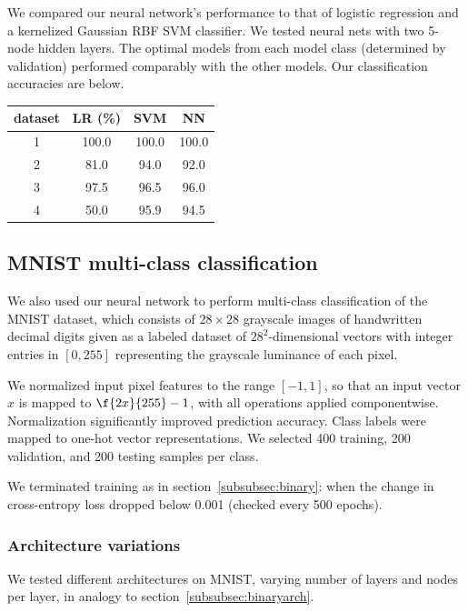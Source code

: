\documentclass{article}
\begin{document}
\begin{multicols}{2}
We compared our neural network's performance to that of 
logistic regression and a kernelized Gaussian RBF SVM classifier.
We tested neural nets with two 5-node hidden layers.
The optimal models from each model class (determined by validation)
performed comparably with the other models.
Our classification accuracies are below.

\begin{center}
    \begin{tabular}{c|c|c|c}
        dataset & LR (\%) & SVM & NN  \\\hline
        1	&100.0& 100.0 & 100.0\\
        2	&81.0 & 94.0 & 92.0 \\
        3	&97.5 & 96.5 & 96.0 \\
        4	&50.0 & 95.9 & 94.5
    \end{tabular}
\end{center}

\subsection{MNIST multi-class classification}

We also used our neural network
to perform multi-class classification of the MNIST dataset,
which consists of $28\times 28$ grayscale images of handwritten decimal digits
given as a labeled dataset of $28^2$-dimensional vectors
with integer entries in $[0,255]$
representing the grayscale luminance of each pixel.

We normalized input pixel features to the range $[-1, 1]$,
so that an input vector $x$ is mapped to $\f{2x}{255}-1$,
with all operations applied componentwise.
Normalization significantly improved prediction accuracy.
Class labels were mapped to one-hot vector representations.
We selected 400 training, 200 validation, and 200 testing samples per class.

We terminated training as in section~\ref{subsubsec:binary}:
when the change in cross-entropy loss dropped below 0.001
(checked every 500 epochs).

\subsubsection{Architecture variations}

We tested different architectures on MNIST,
varying number of layers and nodes per layer,
in analogy to section~\ref{subsubsec:binaryarch}.



\end{multicols}
\end{document}
